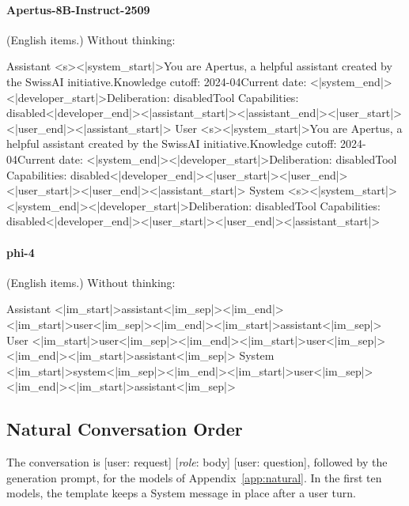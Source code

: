 \paragraph{Apertus-8B-Instruct-2509} (English items.)
\noindent Without thinking:
\begin{Rendering}
Assistant  <s><|system_start|>You are Apertus, a helpful assistant created by the SwissAI initiative.\NL{}Knowledge cutoff: 2024-04\NL{}Current date: <|system_end|><|developer_start|>Deliberation: disabled\NL{}Tool Capabilities: disabled<|developer_end|><|assistant_start|><|assistant_end|><|user_start|><|user_end|><|assistant_start|>
User       <s><|system_start|>You are Apertus, a helpful assistant created by the SwissAI initiative.\NL{}Knowledge cutoff: 2024-04\NL{}Current date: <|system_end|><|developer_start|>Deliberation: disabled\NL{}Tool Capabilities: disabled<|developer_end|><|user_start|><|user_end|><|user_start|><|user_end|><|assistant_start|>
System     <s><|system_start|><|system_end|><|developer_start|>Deliberation: disabled\NL{}Tool Capabilities: disabled<|developer_end|><|user_start|><|user_end|><|assistant_start|>
\end{Rendering}
\paragraph{phi-4} (English items.)
\noindent Without thinking:
\begin{Rendering}
Assistant  <|im_start|>assistant<|im_sep|><|im_end|><|im_start|>user<|im_sep|><|im_end|><|im_start|>assistant<|im_sep|>
User       <|im_start|>user<|im_sep|><|im_end|><|im_start|>user<|im_sep|><|im_end|><|im_start|>assistant<|im_sep|>
System     <|im_start|>system<|im_sep|><|im_end|><|im_start|>user<|im_sep|><|im_end|><|im_start|>assistant<|im_sep|>
\end{Rendering}

\subsection{Natural Conversation Order}
\label{app:templates_natural}

The conversation is [user: request] [\textit{role}: body] [user: question], followed by the generation prompt, for the models of Appendix~\ref{app:natural}. In the first ten models, the template keeps a System message in place after a user turn.

